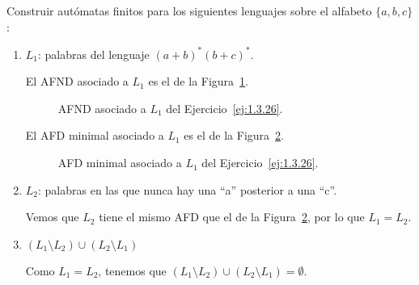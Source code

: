 \begin{ejercicio}\label{ej:1.3.26}
    Construir autómatas finitos para los siguientes lenguajes sobre el alfabeto $\{a,b,c\}$:
    \begin{enumerate}
        \item $L_1$: palabras del lenguaje ${(a+b)}^{\ast}{(b+c)}^{\ast}$.
        
        El AFND asociado a $L_1$ es el de la Figura~\ref{fig:1.3.26-L1-ND}.
        \begin{figure}
            \centering
            \caption{AFND asociado a $L_1$ del Ejercicio~\ref{ej:1.3.26}.}
            \label{fig:1.3.26-L1-ND}
        \end{figure}

        El AFD minimal asociado a $L_1$ es el de la Figura~\ref{fig:1.3.26-L1}.
        \begin{figure}
            \centering
            \caption{AFD minimal asociado a $L_1$ del Ejercicio~\ref{ej:1.3.26}.}
            \label{fig:1.3.26-L1}
        \end{figure}
        \item $L_2$: palabras en las que nunca hay una ``a'' posterior a una ``c''.
        
        Vemos que $L_2$ tiene el mismo AFD que el de la Figura~\ref{fig:1.3.26-L1}, por lo que $L_1=L_2$.

        \item $(L_1 \setminus L_2)\cup (L_2 \setminus L_1)$
        
        Como $L_1=L_2$, tenemos que $(L_1 \setminus L_2)\cup (L_2 \setminus L_1)=\emptyset$.
    \end{enumerate}
\end{ejercicio}


